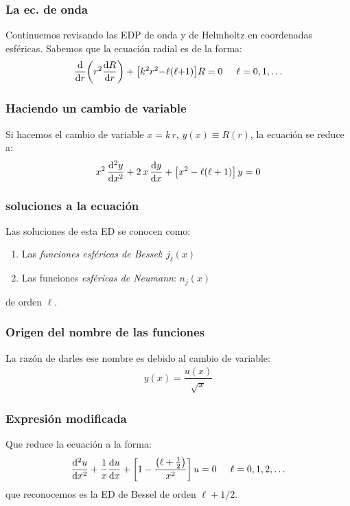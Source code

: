 \documentclass[12pt]{beamer}
\begin{document}
\begin{frame}
\frametitle{La ec. de onda}
Continuemos revisando las EDP de onda y de Helmholtz en coordenadas esféricas. \pause Sabemos que la ecuación radial es de la forma:
\pause
\begin{align*}
\dv{r} \bigg( r^{2} \dv{R}{r} \bigg) + \big[ k^{2} r^{2} {-} \ell (\ell {+} 1) \big] R = 0 \hspace{0.5cm} \ell = 0, 1, \ldots
\end{align*}
\end{frame}
\begin{frame}
\frametitle{Haciendo un cambio de variable}
Si hacemos el cambio de variable $x = k \, r$, $y (x) \equiv R (r)$, la ecuación se reduce a:
\pause
\begin{align*}
x^{2} \, \dv[2]{y}{x} + 2 \, x \, \dv{y}{x} + \big[ x^{2} - \ell (\ell + 1) \big] \, y = 0
\end{align*}
\end{frame}
\begin{frame}
\frametitle{soluciones a la ecuación}
Las soluciones de esta ED se conocen como:
\pause
{}
\begin{enumerate}[<+->]
\item Las \emph{funciones esféricas de Bessel}: $j_{\ell} (x)$
\item Las funciones \emph{esféricas de Neumann}: $n_{j} (x)$
\end{enumerate}
\pause
de orden $\ell$.
\end{frame}
\begin{frame}
\frametitle{Origen del nombre de las funciones}
La razón de darles ese nombre es debido al cambio de variable:
\pause
\begin{align*}
y (x) = \dfrac{u (x)}{\sqrt{x}}
\end{align*}
\end{frame}
\begin{frame}
\frametitle{Expresión modificada}
Que reduce la ecuación a la forma:
\pause
\begin{align*}
\dv[2]{u}{x} + \dfrac{1}{x} \dv{u}{x} + \bigg[ 1 - \dfrac{\big( \ell + \frac{1}{2} \big)}{x^{2}} \bigg] \, u = 0 \hspace{0.5cm} \ell = 0, 1, 2, \ldots
\end{align*}
\pause
que reconocemos es la ED de Bessel de orden $\ell + 1/2$.
\end{frame}
\end{document}
